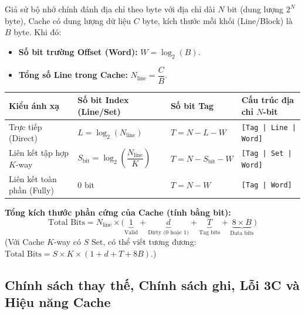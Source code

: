 \begin{tcolorbox}[bwbox, title={Bộ công thức tách bit địa chỉ và kích thước phần cứng Cache}]
Giả sử bộ nhớ chính đánh địa chỉ theo byte với địa chỉ dài $N$ bit (dung lượng $2^N$ byte), Cache có dung lượng dữ liệu $C$ byte, kích thước mỗi khối (Line/Block) là $B$ byte. Khi đó:
\begin{itemize}
    \item \textbf{Số bit trường Offset (Word):} $W = \log_2(B)$.
    \item \textbf{Tổng số Line trong Cache:} $N_{\text{line}} = \dfrac{C}{B}$.
\end{itemize}
\begin{center}
\renewcommand{\arraystretch}{1.25}
\small
\begin{tabularx}{\linewidth}{|L{3.5cm}|Z|Z|Z|}
\hline
\textbf{Kiểu ánh xạ} & \textbf{Số bit Index (Line/Set)} & \textbf{Số bit Tag} & \textbf{Cấu trúc địa chỉ $N$-bit} \\ \hline
Trực tiếp (Direct) & $L = \log_2(N_{\text{line}})$ & $T = N - L - W$ & \texttt{[Tag | Line | Word]} \\ \hline
Liên kết tập hợp $K$-way & $S_{\text{bit}} = \log_2\!\left(\dfrac{N_{\text{line}}}{K}\right)$ & $T = N - S_{\text{bit}} - W$ & \texttt{[Tag | Set | Word]} \\ \hline
Liên kết toàn phần (Fully) & $0$ bit & $T = N - W$ & \texttt{[Tag | Word]} \\ \hline
\end{tabularx}
\end{center}
\textbf{Tổng kích thước phần cứng của Cache (tính bằng bit):}
$$\text{Total Bits} = N_{\text{line}} \times \big(\underbrace{1}_{\text{Valid}} + \underbrace{d}_{\text{Dirty (0 hoặc 1)}} + \underbrace{T}_{\text{Tag bits}} + \underbrace{8 \times B}_{\text{Data bits}}\big)$$
(Với Cache $K$-way có $S$ Set, có thể viết tương đương: $\text{Total Bits} = S \times K \times (1 + d + T + 8B)$.)
\end{tcolorbox}

\subsection{Chính sách thay thế, Chính sách ghi, Lỗi 3C và Hiệu năng Cache}

